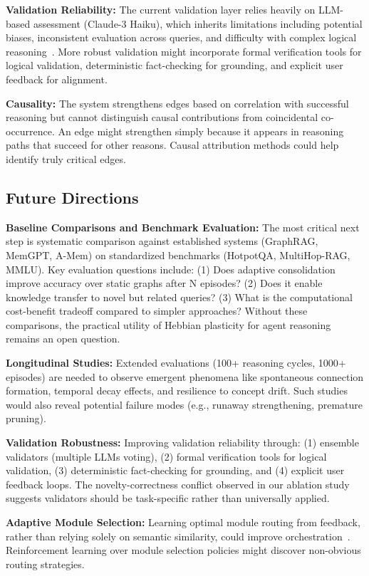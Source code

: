 \documentclass{article}
\begin{document}
\textbf{Validation Reliability:} The current validation layer relies heavily on LLM-based assessment (Claude-3 Haiku), which inherits limitations including potential biases, inconsistent evaluation across queries, and difficulty with complex logical reasoning~\citep{pan2024unifying}. More robust validation might incorporate formal verification tools for logical validation, deterministic fact-checking for grounding, and explicit user feedback for alignment.

\textbf{Causality:} The system strengthens edges based on correlation with successful reasoning but cannot distinguish causal contributions from coincidental co-occurrence. An edge might strengthen simply because it appears in reasoning paths that succeed for other reasons. Causal attribution methods could help identify truly critical edges.

\subsection{Future Directions}

\textbf{Baseline Comparisons and Benchmark Evaluation:} The most critical next step is systematic comparison against established systems (GraphRAG, MemGPT, A-Mem) on standardized benchmarks (HotpotQA, MultiHop-RAG, MMLU). Key evaluation questions include: (1) Does adaptive consolidation improve accuracy over static graphs after N episodes? (2) Does it enable knowledge transfer to novel but related queries? (3) What is the computational cost-benefit tradeoff compared to simpler approaches? Without these comparisons, the practical utility of Hebbian plasticity for agent reasoning remains an open question.

\textbf{Longitudinal Studies:} Extended evaluations (100+ reasoning cycles, 1000+ episodes) are needed to observe emergent phenomena like spontaneous connection formation, temporal decay effects, and resilience to concept drift. Such studies would also reveal potential failure modes (e.g., runaway strengthening, premature pruning).

\textbf{Validation Robustness:} Improving validation reliability through: (1) ensemble validators (multiple LLMs voting), (2) formal verification tools for logical validation, (3) deterministic fact-checking for grounding, and (4) explicit user feedback loops. The novelty-correctness conflict observed in our ablation study suggests validators should be task-specific rather than universally applied.

\textbf{Adaptive Module Selection:} Learning optimal module routing from feedback, rather than relying solely on semantic similarity, could improve orchestration~\citep{chen2024pog}. Reinforcement learning over module selection policies might discover non-obvious routing strategies.
\end{document}
